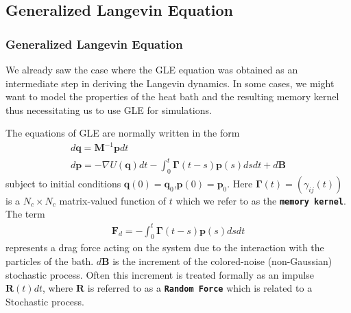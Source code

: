 \documentclass[a4paper,8pt]{beamer}
\newcommand{\BS}[1]{\boldsymbol{#1}}
\begin{document}
	\begin{frame}
		\section{Generalized Langevin Equation}
		\frametitle{Generalized Langevin Equation}
		We already saw the case where the GLE equation was obtained as an intermediate step in deriving the Langevin dynamics. In some cases, we might want to model the properties of the heat bath and the resulting memory kernel thus necessitating us to use GLE for simulations.
		
		The equations of GLE are normally written in the form
		\begin{gather}
			d\BS{q} = \BS{M}^{-1} \BS{p} dt \\
			d\BS{p} = -\nabla U(\BS{q}) dt - \int_{0}^{t} \BS{\Gamma}(t-s) \BS{p}(s) ds dt + d\BS{B}
		\end{gather}
		subject to initial conditions $\BS{q}(0) = \BS{q}_{0}$,$\BS{p}(0) = \BS{p}_{0}$. Here $\BS{\Gamma}(t) = (\gamma_{ij}(t))$ is a $N_c \times N_c$ matrix-valued function of $t$ which we refer to as the \textbf{\texttt{memory kernel}}. The term
		\begin{gather}
			\BS{F}_d = - \int_{0}^{t} \BS{\Gamma}(t-s) \BS{p}(s) ds dt
		\end{gather}
		represents a drag force acting on the system due to the interaction with the particles of the bath. $d\BS{B}$ is the increment of the colored-noise (non-Gaussian) stochastic process. Often this increment is treated formally as an impulse $\BS{R}(t)dt$, where $\BS{R}$ is referred to as a \textbf{\texttt{Random Force}} which is related to a Stochastic process.
	\end{frame}
\end{document}
